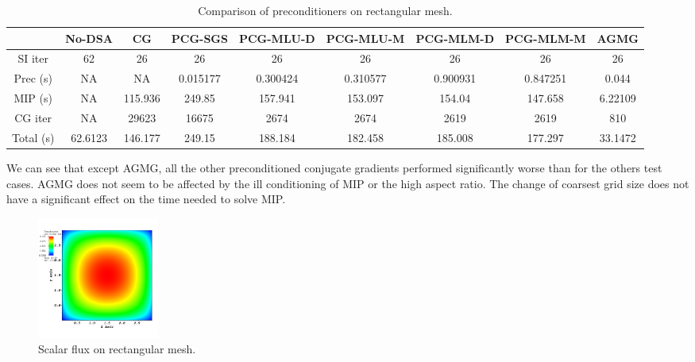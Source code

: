 \begin{landscape}
  \begin{center}
    \begin{table}[H]
      \caption{Comparison of preconditioners on rectangular mesh.}
      \begin{centering}
        \begin{tabular}{|c|c|c|c|c|c|c|c|c|}
          \hline
          & No-DSA & CG & PCG-SGS & PCG-MLU-D & PCG-MLU-M & PCG-MLM-D &
          PCG-MLM-M & AGMG \\
          \hline
          SI iter    & 62      & 26      & 26       & 26       & 26       & 
            26       & 26       &  26 \\
          Prec (s)   & NA      & NA      & 0.015177 & 0.300424 & 0.310577 &
            0.900931 & 0.847251 & 0.044 \\
          MIP (s)    & NA      & 115.936 & 249.85   & 157.941  & 153.097  & 
            154.04   & 147.658  & 6.22109\\
          CG iter    & NA      & 29623   & 16675    & 2674     & 2674     & 
            2619     & 2619     & 810 \\
          Total (s)  & 62.6123 & 146.177 & 249.15   & 188.184  & 182.458  & 
            185.008  & 177.297  & 33.1472\\
          \hline
        \end{tabular}
      \end{centering}
    \end{table}
  \end{center}
\end{landscape}
We can see that except AGMG, all the other preconditioned conjugate gradients
performed significantly worse than for the others test cases. AGMG does not
seem to be affected by the ill conditioning of MIP or the high aspect ratio.
The change of coarsest grid size does not have a significant effect on the
time needed to solve MIP.
\begin{figure}[H]
  \centering
  \includegraphics[width=4cm]{./Dsa/rectangle}
  \caption{Scalar flux on rectangular mesh.}
\end{figure}
